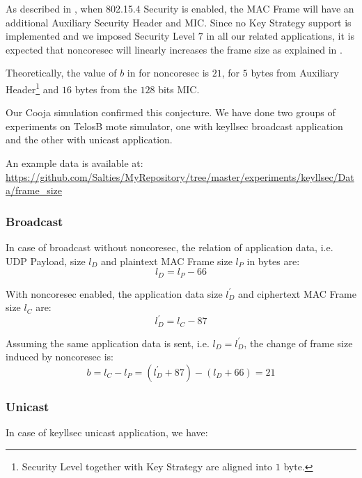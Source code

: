 As described in , when 802.15.4 Security is enabled, the MAC Frame will have an additional Auxiliary Security Header and MIC. Since no Key Strategy support is implemented and we imposed Security Level $7$ in all our related applications, it is expected that noncoresec will linearly increases the frame size as explained in .

Theoretically, the value of $b$ in  for noncoresec is $21$, for $5$ bytes from Auxiliary Header\footnote{Security Level together with Key Strategy are aligned into $1$ byte.} and $16$ bytes from the $128$ bits MIC.

Our Cooja simulation confirmed this conjecture. We have done two groups of experiments on TelosB mote simulator, one with keyllsec broadcast application and the other with unicast application.

An example data is available at: \\
\url{https://github.com/Salties/MyRepository/tree/master/experiments/keyllsec/Data/frame_size}

\subsubsection{Broadcast}
In case of broadcast without noncoresec, the relation of application data, i.e. UDP Payload, size $l_D$ and plaintext MAC Frame size $l_P$ in bytes are:
\begin{equation}
	l_D = l_{P} - 66
\end{equation}

With noncoresec enabled, the application data size $l^{\prime}_D$ and ciphertext MAC Frame size $l_C$ are:
\begin{equation} \label{Eq: broadcast llsec data size}
	l^{\prime}_D = l_{C} - 87
\end{equation}

Assuming the same application data is sent, i.e. $l_D = l^{\prime}_D$, the change of frame size induced by noncoresec is:
\begin{equation}
	b = l_C - l_P = (l^{\prime}_D + 87) - (l_D + 66) = 21
\end{equation}

\subsubsection{Unicast}

In case of keyllsec unicast application, we have:

